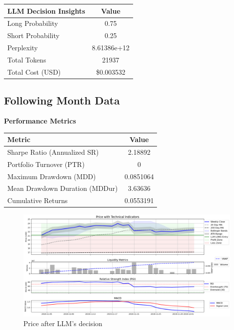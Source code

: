 \documentclass[8pt]{scrartcl}
\begin{document}
\begin{longtable}{l c}
\toprule
\textbf{LLM Decision Insights} & \textbf{Value} \\
\midrule
Long Probability & 0.75 \\
Short Probability & 0.25 \\
Perplexity & 8.61386e+12 \\
\midrule
Total Tokens & 21937 \\
Total Cost (USD) & \$0.003532 \\
\bottomrule
\end{longtable}

\subsection*{Following Month Data}

\textbf{Performance Metrics}

\begin{longtable}{l c}
\toprule
\textbf{Metric} & \textbf{Value} \\
\midrule
Sharpe Ratio (Annualized SR) & 2.18892 \\
Portfolio Turnover (PTR) & 0 \\
Maximum Drawdown (MDD) & 0.0851064 \\
Mean Drawdown Duration (MDDur) & 3.63636 \\
Cumulative Returns & 0.0553191 \\
\bottomrule
\end{longtable}

\begin{figure}[H]
    \centering
    \includegraphics[width=1\linewidth]{judge_reviews//TSLA_M_gpt-4o-mini//2019-11-04/llm_Price_with_Technical_Indicators.png}
    \caption{Price after LLM's decision}
\end{figure}
\end{document}
